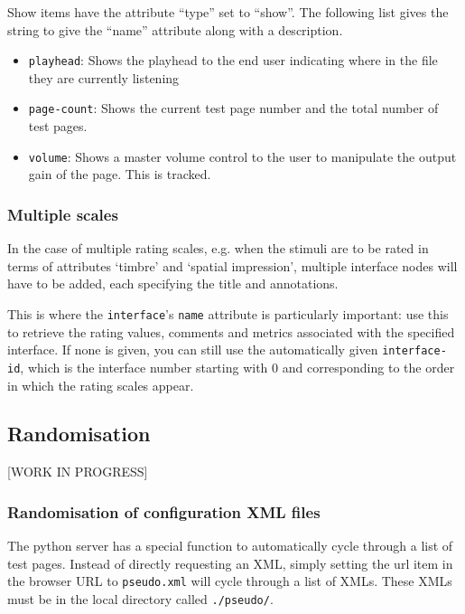 \documentclass[11pt, oneside]{article}   	%
\begin{document}
        Show items have the attribute ``type'' set to ``show''. The following list gives the string to give the ``name'' attribute along with a description.
        \begin{itemize}
            \item \texttt{playhead}: Shows the playhead to the end user indicating where in the file they are currently listening
            \item \texttt{page-count}: Shows the current test page number and the total number of test pages.
            \item \texttt{volume}: Shows a master volume control to the user to manipulate the output gain of the page. This is tracked.
        \end{itemize}

		\subsubsection{Multiple scales}
			In the case of multiple rating scales, e.g. when the stimuli are to be rated in terms of attributes `timbre' and `spatial impression', multiple interface nodes will have to be added, each specifying the title and annotations. 

			This is where the \texttt{interface}'s \texttt{name} attribute is particularly important: use this to retrieve the rating values, comments and metrics associated with the specified interface. 
			If none is given, you can still use the automatically given \texttt{interface-id}, which is the interface number starting with 0 and corresponding to the order in which the rating scales appear. 

	\subsection{Randomisation}
	\label{sec:randomisation}
		[WORK IN PROGRESS]

		\subsubsection{Randomisation of configuration XML files}
		    The python server has a special function to automatically cycle through a list of test pages. Instead of directly requesting an XML, simply setting the url item in the browser URL to \texttt{pseudo.xml} will cycle through a list of XMLs. These XMLs must be in the local directory called \texttt{./pseudo/}.
\end{document}
